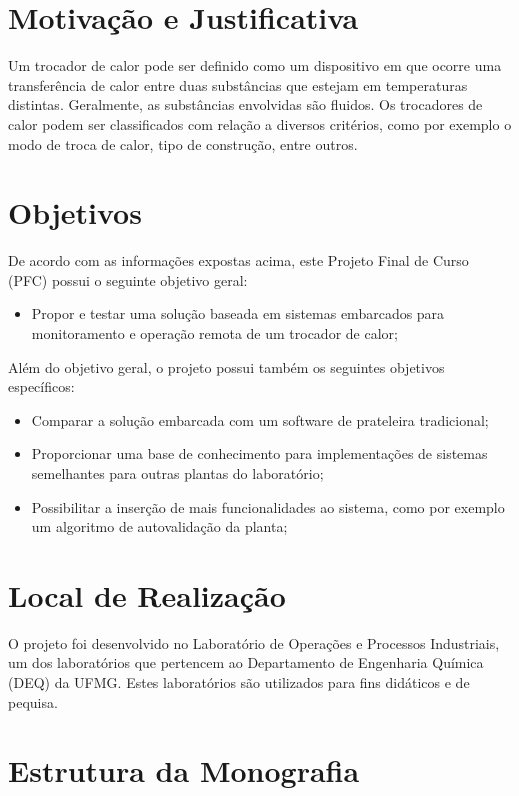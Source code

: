\section{Motivação e Justificativa}

	Um trocador de calor pode ser definido como um dispositivo em que ocorre uma transferência de calor entre duas substâncias que estejam em temperaturas distintas. Geralmente, as substâncias envolvidas são fluidos. Os trocadores de calor podem ser classificados com relação a diversos critérios, como por exemplo o modo de troca de calor, tipo de construção, entre outros. \cite{kreith2011}
	
	
	
\section{Objetivos}
	De acordo com as informações expostas acima, este Projeto Final de Curso (PFC) possui o seguinte objetivo geral:
	
	\begin{itemize}
		\item 
		Propor e testar uma solução baseada em sistemas embarcados para monitoramento e operação remota de um trocador de calor;
	\end{itemize}
	
	Além do objetivo geral, o projeto possui também os seguintes objetivos específicos:
	
	\begin{itemize}
		\item 
		Comparar a solução embarcada com um software de prateleira tradicional;
		\item 
		Proporcionar uma base de conhecimento para implementações de sistemas semelhantes para outras plantas do laboratório;
		\item 
		Possibilitar a inserção de mais funcionalidades ao sistema, como por exemplo um algoritmo de autovalidação da planta;
	\end{itemize}
	

\section{Local de Realização}
	O projeto foi desenvolvido no Laboratório de Operações e Processos Industriais, um dos laboratórios que pertencem ao Departamento de Engenharia Química (DEQ) da UFMG. Estes laboratórios são utilizados para fins didáticos e de pequisa.

\section{Estrutura da Monografia}